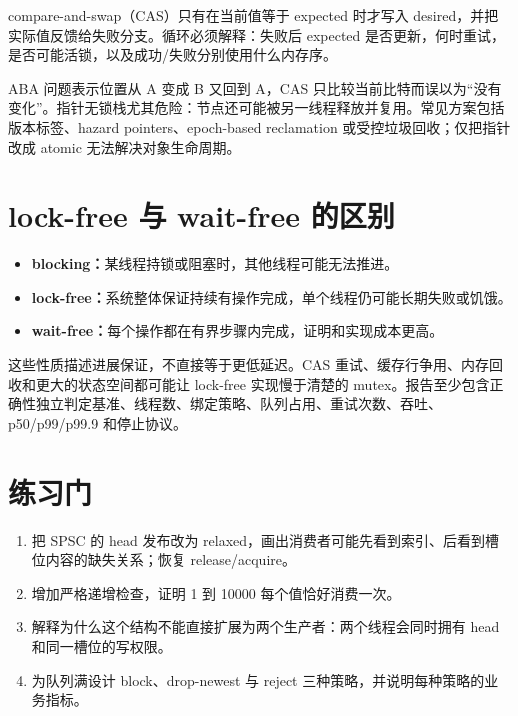 compare-and-swap（CAS）只有在当前值等于 expected 时才写入 desired，并把实际值反馈给失败分支。循环必须解释：失败后 expected 是否更新，何时重试，是否可能活锁，以及成功/失败分别使用什么内存序。

ABA 问题表示位置从 A 变成 B 又回到 A，CAS 只比较当前比特而误以为“没有变化”。指针无锁栈尤其危险：节点还可能被另一线程释放并复用。常见方案包括版本标签、hazard pointers、epoch-based reclamation 或受控垃圾回收；仅把指针改成 atomic 无法解决对象生命周期。

\section{lock-free 与 wait-free 的区别}

\begin{itemize}
  \item \textbf{blocking：}某线程持锁或阻塞时，其他线程可能无法推进。
  \item \textbf{lock-free：}系统整体保证持续有操作完成，单个线程仍可能长期失败或饥饿。
  \item \textbf{wait-free：}每个操作都在有界步骤内完成，证明和实现成本更高。
\end{itemize}

这些性质描述进展保证，不直接等于更低延迟。CAS 重试、缓存行争用、内存回收和更大的状态空间都可能让 lock-free 实现慢于清楚的 mutex。报告至少包含正确性独立判定基准、线程数、绑定策略、队列占用、重试次数、吞吐、p50/p99/p99.9 和停止协议。

\section{练习门}

\begin{enumerate}
  \item 把 SPSC 的 head 发布改为 relaxed，画出消费者可能先看到索引、后看到槽位内容的缺失关系；恢复 release/acquire。
  \item 增加严格递增检查，证明 1 到 10000 每个值恰好消费一次。
  \item 解释为什么这个结构不能直接扩展为两个生产者：两个线程会同时拥有 head 和同一槽位的写权限。
  \item 为队列满设计 block、drop-newest 与 reject 三种策略，并说明每种策略的业务指标。
\end{enumerate}
